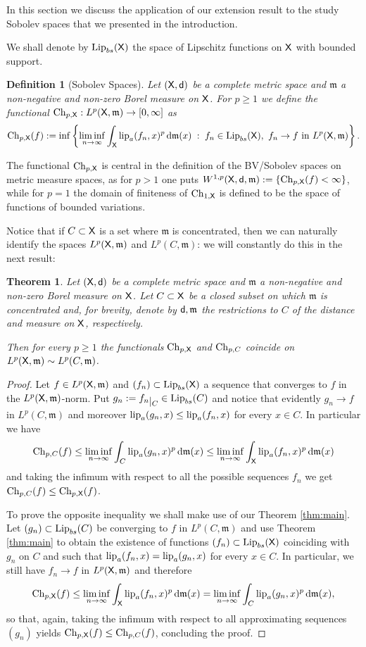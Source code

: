 \documentclass[9pt,reqno]{amsart}
\newtheorem{defn}{Definition}[section]
\newtheorem{thm}{Theorem}[section]
\renewcommand{\d}{{\rm d}}
\newcommand{\sfd}{{\sf d}}
\newcommand{\X}{{\sf X}}
\newcommand{\Y}{C}
\def\lipa#1#2{{\rm lip}_a (#1,#2)}
\newcommand{\Ch}{{\rm Ch}}
\newcommand{\restr}[1]{\lower3pt\hbox{$|_{#1}$}} %
\def\mm{\mathfrak m}
\begin{document}
In this section we discuss the  application of our extension result to the study Sobolev spaces that we presented in the introduction.

We shall denote by ${\rm Lip}_{bs} (\X)$ the space of Lipschitz functions  on $\X$ with bounded support. 
\begin{defn}[Sobolev Spaces] Let $(\X,\sfd)$ be a complete metric space and $\mm$ a non-negative and non-zero Borel measure on $\X$. For $p\geq 1$ we define the functional $\Ch_{p,\X} : L^p(\X, \mm) \to [0 , \infty]$ as
\[
\Ch_{p,\X} ( f) : = \inf \left\{ \liminf_{n \to \infty} \int_\X \lipa{f_n}{x}^p \, \d\mm (x) \; : \;  f_n \in {\rm Lip}_{bs}(\X) ,\ f_n \to f \text{ in }L^p(\X, \mm) \right\}.
\]
\end{defn}
The functional $\Ch_{p,\X} $ is central in the definition of the BV/Sobolev spaces on metric measure spaces, as for $p>1$ one puts $W^{1,p}(\X,\sfd, \mm):=\{\Ch_{p,\X}(f) < \infty\}$, while for $p=1$ the domain of finiteness of $\Ch_{1,\X}$ is defined to be the space of functions of bounded variations.

Notice that if $\Y\subset\X$ is a set where $\mm$ is concentrated, then we can naturally identify the spaces $L^p(\X,\mm)$ and $L^p(\Y,\mm)$: we will constantly do this in the next result:
\begin{thm}\label{thm:sobapp} Let $(\X,\sfd)$ be a complete metric space and $\mm$ a non-negative and non-zero Borel measure on $\X$. Let  $\Y\subset\X$ be a closed subset on which $\mm$ is concentrated and, for brevity, denote by $\sfd,\mm$ the restrictions to $\Y$ of the distance and measure on $\X$, respectively.

Then for every $p\geq1$ the functionals  $\Ch_{p,\X}$ and $\Ch_{p,\Y}$ coincide on $L^p(\X, \mm)\sim L^p(\Y, \mm)$.
\end{thm}
\begin{proof} Let $f \in L^p(\X,\mm)$ and $(f_n)\subset {\rm Lip}_{bs}(\X)$ a sequence that converges to $f$ in the $L^p(\X,\mm)$-norm. Put $g_n:=f_n\restr \Y\in {\rm Lip}_{bs}(\Y)$ and notice that evidently    $g_n \to f$ in $L^p(\Y,\mm)$ and moreover $\lipa{g_n}{x} \leq \lipa{f_n}{x} $ for every $x \in \Y$. In particular we have
\[
 \Ch_{p,\Y} (f)  \leq \liminf_{n \to \infty} \int_\Y \lipa{g_n}{x}^p \, \d \mm(x) \leq \liminf_{n \to \infty} \int_\X \lipa{f_n}{x}^p \, \d \mm(x)
 \]
and  taking the infimum with respect to all the possible sequences $f_n$ we get $ \Ch_{p,\Y}(f) \leq  \Ch_{p,\X}(f)$. 

To prove the opposite inequality we shall make use of our Theorem \ref{thm:main}. Let   $(g_n)\subset {\rm Lip}_{bs}(\Y)$ be converging to $f$ in  $L^p(\Y,\mm)$ and use  Theorem \ref{thm:main} to obtain the existence of functions $(f_n)\subset {\rm Lip}_{bs}(\X)$ coinciding with $g_n$ on $\Y$ and such that $\lipa{f_n}{x} = \lipa{g_n}{x}$ for every $x\in\Y$. In particular, we still have $f_n\to f$ in $L^p(\X,\mm)$ and therefore
\[
 \Ch_{p,\X} (f)  \leq \liminf_{n \to \infty} \int_\X \lipa{f_n}{x}^p \, \d \mm(x) = \liminf_{n \to \infty} \int_\Y \lipa{g_n}{x}^p \, \d \mm(x),
 \]
so that, again, taking the infimum with respect to all approximating sequences $(g_n)$ yields  $\Ch_{p,\X}(f) \leq \Ch_{p,\Y}(f)$, concluding  the proof.
\end{proof}
\end{document}
